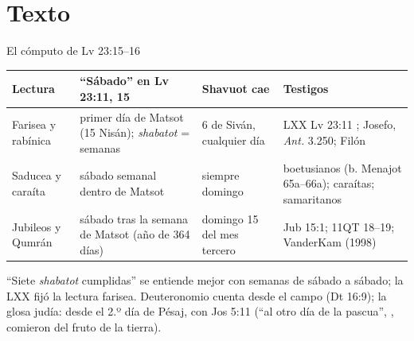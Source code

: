 \section{Texto}

\begin{frame}{El cómputo de Lv 23:15--16}
\scriptsize\renewcommand{\arraystretch}{1.18}
\begin{tabular}{@{}L{2.3cm}L{3.5cm}L{2.3cm}L{3.4cm}@{}}
\toprule
\textbf{Lectura} & \textbf{``Sábado'' en Lv 23:11, 15} & \textbf{Shavuot cae} & \textbf{Testigos} \\ \midrule
Farisea y rabínica & primer día de Matsot (15 Nisán); \emph{shabatot} = semanas & 6 de Siván, cualquier día & LXX Lv 23:11 ; Josefo, \emph{Ant.} 3.250; Filón \\
Saducea y caraíta & sábado semanal dentro de Matsot & siempre domingo & boetusianos (b. Menajot 65a--66a); caraítas; samaritanos \\
Jubileos y Qumrán & sábado tras la semana de Matsot (año de 364 días) & domingo 15 del mes tercero & Jub 15:1; 11QT 18--19; VanderKam (1998) \\
\bottomrule
\end{tabular}\par\medskip
\small\RaggedRight ``Siete \emph{shabatot} cumplidas'' se entiende mejor con semanas de sábado a sábado; la LXX fijó la lectura farisea. Deuteronomio cuenta desde el campo (Dt 16:9); la glosa judía: desde el 2.º día de Pésaj, con Jos 5:11 (``al otro día de la pascua'', , comieron del fruto de la tierra).\par\smallskip
{}
\end{frame}


